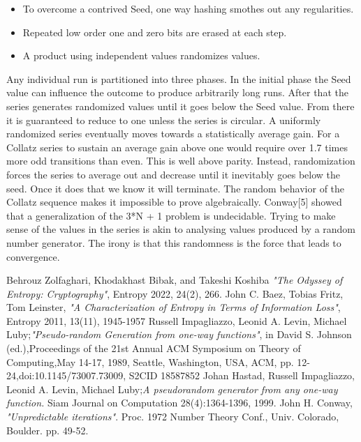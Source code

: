 \documentclass[letterpaper]{article}
\begin{document}
\begin{itemize}
    \item To overcome a contrived Seed, one way hashing smothes out any regularities.
    \item Repeated low order one and zero bits are erased at each step.
    \item A product using independent values randomizes values.
\end{itemize}
Any individual run is partitioned into three phases. In the initial phase the Seed value can influence the outcome to produce arbitrarily long runs. After that the series generates randomized values until it goes below the Seed value. From there it is guaranteed to reduce to one unless the series is circular.
A uniformly randomized series eventually moves towards a statistically average gain. For a Collatz series to sustain an average gain above one would require over 1.7 times more odd transitions than even. This is well above parity. Instead, randomization forces the series to average out and decrease until it inevitably goes below the seed. Once it does that we know it will terminate.
The random behavior of the Collatz sequence makes it impossible to prove algebraically. Conway[5] showed that a generalization of the 3*N + 1 problem is undecidable. Trying to make sense of the values in the series is akin to analysing values produced by a random number generator. The irony is that this randomness is the force that leads to convergence. 

\begin{thebibliography}{9}
Behrouz Zolfaghari, Khodakhast Bibak, and Takeshi Koshiba \emph{"The Odyssey of Entropy: Cryptography"}, Entropy 2022, 24(2), 266.%
John C. Baez, Tobias Fritz, Tom Leinster, \emph{"A Characterization of Entropy in Terms of Information Loss"}, Entropy 2011, 13(11), 1945-1957%
Russell Impagliazzo, Leonid A. Levin, Michael Luby;\emph{"Pseudo-random Generation from one-way functions"}, in David S. Johnson (ed.),Proceedings of the 21st Annual ACM Symposium on Theory of Computing,May 14-17, 1989, Seattle, Washington, USA, {ACM}, pp. 12-24,doi:10.1145/73007.73009, S2CID 18587852%
Johan Hastad, Russell Impagliazzo, Leonid A. Levin, Michael Luby;\emph{A pseudorandom generator from any one-way function.} Siam Journal on Computation 28(4):1364-1396, 1999.%
John H. Conway, \emph{"Unpredictable iterations"}. Proc. 1972 Number Theory Conf., Univ. Colorado, Boulder. pp. 49-52. 
\end{thebibliography}
\end{document}
